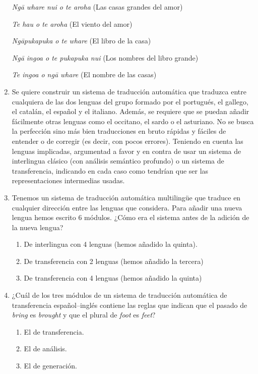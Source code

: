 \begin{enumerate}
\begin{example} \emph{Ng\={a} whare nui o te aroha} (Las casas grandes del amor) \end{example} \begin{example} \emph{Te hau o te aroha} (El viento del amor) \end{example} \begin{example} \emph{Ng\={a}pukapuka o te whare} (El libro de la casa) \end{example} \begin{example} \emph{Ng\={a} ingoa o te pukapuka nui} (Los nombres del libro grande) \end{example} \begin{example} \emph{Te ingoa o ng\={a} whare} (El nombre de las casas) \end{example} 

\item Se quiere construir un sistema de traducción automática que traduzca entre cualquiera de las dos lenguas del grupo formado por el portugués, el gallego, el catalán, el español y el italiano. Además, se requiere que se puedan añadir fácilmente otras lenguas como el occitano, el sardo o el asturiano. No se busca la perfección sino más bien traducciones en bruto rápidas y fáciles de entender o de corregir (es decir, con pocos errores). Teniendo en cuenta las lenguas implicadas, argumentad a favor y en contra de usar un sistema de interlingua clásico (con análisis semántico profundo) o un sistema de transferencia, indicando en cada caso como tendrían que ser las representaciones intermedias usadas. 

\item Tenemos un sistema de traducción automática multilingüe que traduce en cualquier dirección entre las lenguas que considera. Para añadir una nueva lengua hemos escrito 6 módulos. ¿Cómo era el sistema antes de la adición de la nueva lengua? \begin{enumerate} \item De interlingua con 4 lenguas (hemos añadido la quinta). \item De transferencia con 2 lenguas (hemos añadido la tercera) \item De transferencia con 4 lenguas (hemos añadido la quinta) \end{enumerate} 

\item ¿Cuál de los tres módulos de un sistema de traducción automática de transferencia español--inglés contiene las reglas que indican que el pasado de \emph{bring} es \emph{brought} y que el plural de \emph{foot} es \emph{feet}? \begin{enumerate} \item El de transferencia. \item El de análisis. \item El de generación. \end{enumerate} 


\end{enumerate}
